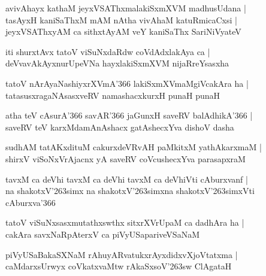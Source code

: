 \begin{shloka}
avivAhayx kathaM jeyxVSAThxmalakiSxmXVM madhusUdana |\\
tasAyxH kaniSaThxM mAM nAtha vivAhaM katuRmicaCxsi |\\
jeyxVSAThxyAM ca sithxtAyAM veY kaniSaThx SariNiVyateV
\end{shloka}

\begin{shloka}
iti shurxtAvx tatoV viSuNxdaRdw coVdAdxlakAya ca |\\
deVvavAkAyxnurUpeVNa hayxlakiSxmXVM nijaRreYsasxha
\end{shloka}

\begin{shloka}
tatoV nArAyaNashiyxrXVmA\char'366 lakiSxmXVmaMgiVcakAra ha |\\
tatasusxragaNAsasxveRV namashacxkurxH punaH punaH
\end{shloka}

\begin{shloka}
atha teV cAsurA\char'366 savAR\char'366 jaGunxH saveRV balAdhikA\char'366 |\\
saveRV teV karxMdamAnAshacx gatAshecxYva dishoV dasha
\end{shloka}

\begin{shloka}
sudhAM tatAKxdituM cakurxdeVRvAH paMkitxM yathAkarxmaM |\\
shirxV viSoNxVrAjacnx yA saveRV coVcushecxYva parasapxraM
\end{shloka}

\begin{shloka}
tavxM ca deVhi tavxM ca deVhi tavxM ca deVhiVti cAburxvanf |\\
na shakotxV\char'263simx na shakotxV\char'263simxna shakotxV\char'263simxVti cAburxva\char'366
\end{shloka}

\begin{shloka}
tatoV viSuNxsasxmutathxswthx sitxrXVrUpaM ca dadhAra ha |\\
cakAra savxNaRpAterxV ca piVyUSapariveVSaNaM
\end{shloka}

\begin{shloka}
piVyUSaBakaSXNaM rAhuyARvatukxrAyxdidxvXjoVtatxma |\\
caMdarxsUrwyx coVkatxvaMtw rAkaSxsoV\char'263sw ClAgataH
\end{shloka}

